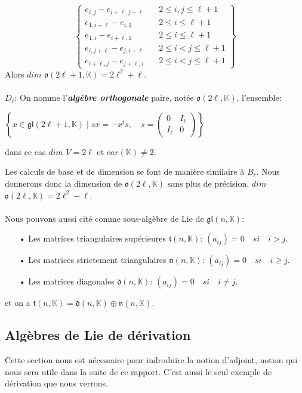 \documentclass[a4paper,openany,12pt]{report}
\newcommand{\KK}{\mathbb{K}}
\newcommand{\gl}{\mathfrak{gl}}
\newcommand{\ttt}{\mathfrak{t}}
\newcommand{\nn}{\mathfrak{n}}
\newcommand{\dd}{\mathfrak{d}}
\newcommand{\oo}{\mathfrak{o}}
\theoremstyle{break}
{\theorembodyfont{\upshape}
\newtheorem*{rmq}{Remarque :}
\newtheorem*{prv}{Preuve :}
\newtheorem*{ex}{Exemples :}
\newtheorem*{exe}{Exemple : }
\newtheorem*{nota}{Notation :}
\newtheorem*{dem}{D\'emonstration :}}
\begin{document}
\[ \left \{
\begin{aligned}
e_{i,j}-e_{i+\ell,j+\ell } & \quad 2\leq i,j \leq \ell+1\\
e_{1,i+\ell}-e_{i,1} & \quad 2 \leq i \leq \ell+1 \\
e_{1,i}-e_{i+\ell,1} & \quad 2 \leq i \leq \ell+1 \\ 
e_{i,j+\ell}-e_{j,i+\ell} & \quad 2 \leq i < j \leq \ell+1\\
e_{i+\ell,j}-e_{j+\ell,i} & \quad 2 \leq i < j \leq \ell+1
\end{aligned}
\right \} \]
Alors $dim$ $\oo(2\ell+1,\KK)=2\ell^2+\ell$.\\
\\
$ D_{\ell} $:  On nomme l'\textbf{\emph{algèbre orthogonale}} paire, notée  $\oo (2\ell,\KK)$, l'ensemble:
\begin{center}
$ \left \{ x \in \gl(2\ell+1, \KK) \mid sx= -x^ts, \quad s =\begin{pmatrix} 0 & I_\ell \\ I_\ell & 0 \end{pmatrix} \right \}$
\end{center}
dans ce cas $dim$ $V=2 \ell$ et $car(\KK) \ne 2$.

Les calculs de base et de dimension se font de manière similaire à $B_{\ell}$. Nous donnerons donc la dimension de $\oo(2\ell,\KK)$ sans plus de précision, $dim$ $\oo(2\ell,\KK)=2\ell^2-\ell$.\\
\\
\quad Nous pouvons aussi cité comme sous-algèbre de Lie de $\gl(n,\KK)$:
\begin{itemize}
\item[•] Les matrices triangulaires supérieures $\ttt(n,\KK)$: $(a_{ij})= 0  \quad si \quad i>j.$

\item[•] Les matrices strictement  triangulaires  $ \nn(n,\KK)$: $(a_{ij})= 0  \quad si \quad i \geq j.$

\item[•] Les matrices diagonales $\dd(n,\KK)$: $(a_{ij})= 0  \quad si \quad i \ne j .$
\end{itemize}
et on a $\ttt(n,\KK)=\dd(n,\KK) \oplus \nn(n,\KK)$.

\subsection{Algèbres de Lie de  dérivation}

\quad Cette section nous est nécessaire pour indroduire la notion d'adjoint, notion qui nous sera utile dans la suite de ce rapport. C'est aussi le seul exemple de dérivation que nous verrons.
\end{document}
